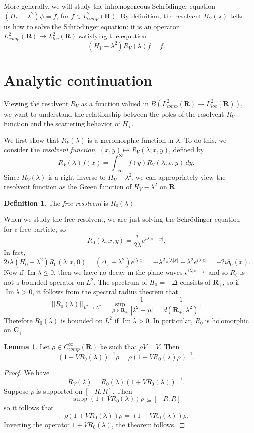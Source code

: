 \documentclass[12pt]{report}
\newcommand{\RR}{\mathbf{R}}
\newcommand{\CC}{\mathbf{C}}
\DeclareMathOperator{\supp}{supp}
\newcommand{\dfn}[1]{\emph{#1}\index{#1}}
\renewcommand{\Im}{\operatorname{Im}}
\theoremstyle{definition}
\newtheorem{lemma}[theorem]{Lemma}
\newtheorem{definition}[theorem]{Definition}
\begin{document}
More generally, we will study the inhomogeneous Schrödinger equation $(H_V - \lambda^2)\psi = f$, for $f \in L^2_{comp}(\RR)$. By definition, the resolvent $R_V(\lambda)$ tells us how to solve the Schrödinger equation: it is an operator $L^2_{comp}(\RR) \to L^2_{loc}(\RR)$ satisfying the equation
$$(H_V - \lambda^2)R_V(\lambda)f = f.$$

\section{Analytic continuation}
Viewing the resolvent $R_V$ as a function valued in $B(L^2_{comp}(\RR) \to L^2_{loc}(\RR))$, we want to understand the relationship between the poles of the resolvent $R_V$ function and the scattering behavior of $H_V$.

We first show that $R_V(\lambda)$ is a meromorphic function in $\lambda$. To do this, we consider the \dfn{resolvent function}, $(x, y) \mapsto R_V(\lambda; x, y)$, defined by
$$R_V(\lambda)f(x) = \int_{-\infty}^\infty f(y) R_V(\lambda; x, y) ~dy.$$
Since $R_V(\lambda)$ is a right inverse to $H_V - \lambda^2$, we can appropriately view the resolvent function as the Green function of $H_V - \lambda^2$ on $\RR$.

\begin{definition}
The \dfn{free resolvent} is $R_0(\lambda)$.
\end{definition}
When we study the free resolvent, we are just solving the Schrödinger equation for a free particle, so
$$R_0(\lambda; x, y) = \frac{i}{2\lambda} e^{i\lambda|x - y|}.$$
In fact,
$$2i\lambda (H_0 - \lambda^2)R_0(\lambda; x, 0) = (\Delta_x + \lambda^2) e^{i\lambda|x|} = -\lambda^2 e^{i\lambda|x|} + \lambda^2 e^{i\lambda|x|} = -2i\delta_0(x).$$
Now if $\Im \lambda \leq 0$, then we have no decay in the plane waves $e^{i\lambda|x - y|}$ and so $R_0$ is not a bounded operator on $L^2$. The spectrum of $H_0 = -\Delta$ consists of $\RR_+$, so if $\Im \lambda > 0$, it follows from the spectral radius theorem that
$$||R_0(\lambda)||_{L^2 \to L^2} = \sup_{\mu \in \RR_+} \frac{1}{|\lambda^2 - \mu|} = \frac{1}{d(\RR_+, \lambda^2)}.$$
Therefore $R_0(\lambda)$ is bounded on $L^2$ if $\Im \lambda > 0$. In particular, $R_0$ is holomorphic on $\CC_+$.

\begin{lemma}
  Let $\rho \in C^\infty_{comp}(\RR)$ be such that $\rho V = V$. Then
$$(1 + VR_0(\lambda))^{-1}\rho = \rho(1 + VR_0(\lambda)\rho)^{-1}.$$
\end{lemma}
\begin{proof}
  We have
  $$R_V(\lambda) = R_0(\lambda)(1 + VR_0(\lambda))^{-1}.$$
  Suppose $\rho$ is supported on $[-R, R]$. Then
  $$\supp (1 + VR_0(\lambda))\rho \subseteq [-R, R]$$
  so it follows that
  $$\rho(1 + VR_0(\lambda))\rho = (1 + VR_0(\lambda))\rho.$$
  Inverting the operator $1 + VR_0(\lambda)$, the theorem follows.
\end{proof}
\end{document}
